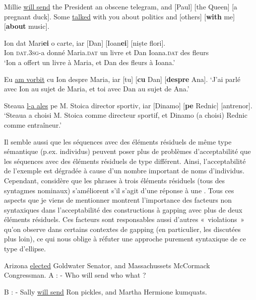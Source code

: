\ea \label{ch2:ex112}
\ea  *Millie \uline{will send} the President an obscene telegram, and [Paul] [the Queen] [a pregnant duck]. \citep[25]{Jackendoff1971} \label{ch2:ex112a} 
\ex  Some \uline{talked} with you about politics and [others] [\textbf{with} me] [\textbf{about} music]. \citep[193]{Winkler2005} \label{ch2:ex112b} 
\z
\z


\ea \label{ch2:ex113}
\ea 
\gll Ion   dat  Mari\textbf{ei} o  carte,  iar  [Dan]  [Ioan\textbf{ei}]  [niște  flori].\\
Ion  \textsc{dat.3sg}{}-a  donné  Maria.\textsc{dat} un  livre  et  Dan  Ioana.\textsc{dat}  des  fleurs\\ 
\glt  ‘Ion a offert un livre à Maria, et Dan des fleurs à Ioana.’

\ex  Eu \uline{am vorbit} cu Ion despre Maria, iar [tu] [\textbf{cu} Dan] [\textbf{despre} Ana].
\glt  ‘J’ai parlé avec Ion au sujet de Maria, et toi avec Dan au sujet de Ana.’  

\ex  Steaua \uline{l-a ales} pe M. Stoica director sportiv, iar [Dinamo] [\textbf{pe} Rednic] [antrenor].
\glt  ‘Steaua a choisi M. Stoica comme directeur sportif, et Dinamo (a choisi) Rednic comme entraîneur.’
\z
\z

Il semble aussi que les séquences avec des éléments résiduels de même type sémantique (p.ex. individus) peuvent poser plus de problèmes d’acceptabilité que les séquences avec des éléments résiduels de type différent. Ainsi, l’acceptabilité de l’exemple  est dégradée à cause d’un nombre important de noms d’individus. Cependant, \citet{Johnson2014} considère que les phrases à trois éléments résiduels (tous des syntagmes nominaux) s’améliorent s’il s’agit d’une réponse à une  . Tous ces aspects que je viens de mentionner montrent l’importance des facteurs non syntaxiques dans l’acceptabilité des constructions à gapping avec plus de deux éléments résiduels. Ces facteurs sont responsables aussi d’autres «~violations~» qu’on observe dans certains contextes de gapping (en particulier, les  discutées plus loin), ce qui nous oblige à réfuter une approche purement syntaxique de ce type d’ellipse.  

\ea
\ea  *Arizona \uline{elected} Goldwater Senator, and Massachussets McCormack Congressman. \citep[25]{Jackendoff1971} \label{ch2:ex114a}
\ex  A : - Who will send who what ?

B : - Sally \uline{will send} Ron pickles, and Martha Hermione kumquats. \citep{Johnson2014} \label{ch2:ex114b}

